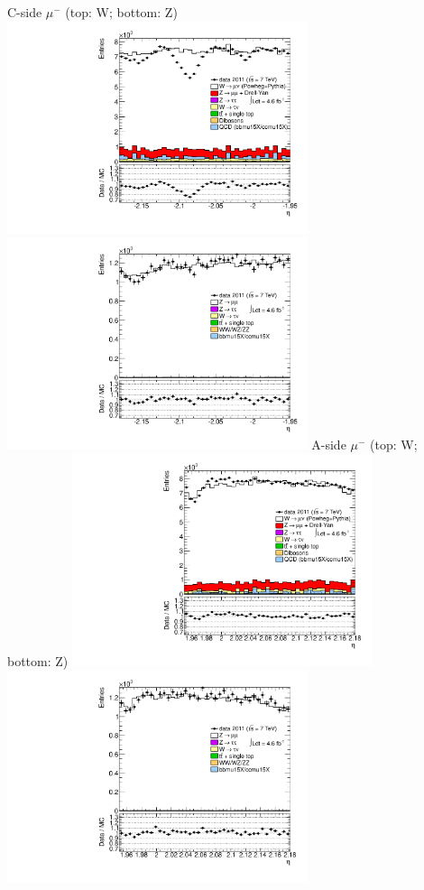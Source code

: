  {
\colb[T]
C-side $\mu^{-}$ (top: W; bottom: Z)
\centering
\includegraphics[width=0.66\textwidth]{dates/20130306/figures/etaphi/W_10_C_stack_l_eta_NEG} \\
\includegraphics[width=0.66\textwidth]{dates/20130306/figures/etaphi/Ztprobet_10_C_stack_lN_eta_ALL.pdf}
A-side $\mu^{-}$ (top: W; bottom: Z)
\centering
\includegraphics[width=0.66\textwidth]{dates/20130306/figures/etaphi/W_10_A_stack_l_eta_NEG} \\
\includegraphics[width=0.66\textwidth]{dates/20130306/figures/etaphi/Ztprobet_10_A_stack_lN_eta_ALL.pdf} 
\cole
}

